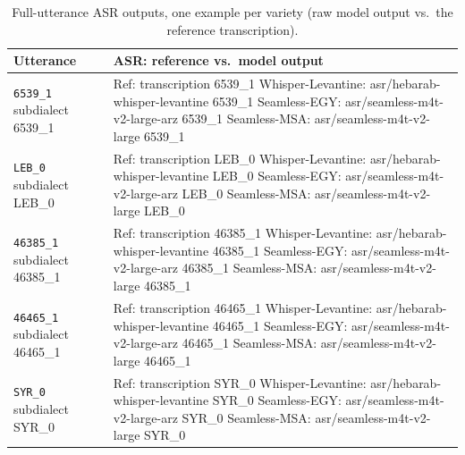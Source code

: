 \begin{table}[t]
\centering
\small
\begin{tabular}{p{} p{}}
\toprule
\textbf{Utterance} & \textbf{ASR: reference vs.\ model output} \\
\midrule
\texttt{6539\_1} \newline \scriptsize {{subdialect 6539_1}} & Ref: {{transcription 6539_1}} \newline Whisper-Levantine: {{asr/hebarab-whisper-levantine 6539_1}} \newline Seamless-EGY: {{asr/seamless-m4t-v2-large-arz 6539_1}} \newline Seamless-MSA: {{asr/seamless-m4t-v2-large 6539_1}} \\
\addlinespace[4pt]
\texttt{LEB\_0} \newline \scriptsize {{subdialect LEB_0}} & Ref: {{transcription LEB_0}} \newline Whisper-Levantine: {{asr/hebarab-whisper-levantine LEB_0}} \newline Seamless-EGY: {{asr/seamless-m4t-v2-large-arz LEB_0}} \newline Seamless-MSA: {{asr/seamless-m4t-v2-large LEB_0}} \\
\addlinespace[4pt]
\texttt{46385\_1} \newline \scriptsize {{subdialect 46385_1}} & Ref: {{transcription 46385_1}} \newline Whisper-Levantine: {{asr/hebarab-whisper-levantine 46385_1}} \newline Seamless-EGY: {{asr/seamless-m4t-v2-large-arz 46385_1}} \newline Seamless-MSA: {{asr/seamless-m4t-v2-large 46385_1}} \\
\addlinespace[4pt]
\texttt{46465\_1} \newline \scriptsize {{subdialect 46465_1}} & Ref: {{transcription 46465_1}} \newline Whisper-Levantine: {{asr/hebarab-whisper-levantine 46465_1}} \newline Seamless-EGY: {{asr/seamless-m4t-v2-large-arz 46465_1}} \newline Seamless-MSA: {{asr/seamless-m4t-v2-large 46465_1}} \\
\addlinespace[4pt]
\texttt{SYR\_0} \newline \scriptsize {{subdialect SYR_0}} & Ref: {{transcription SYR_0}} \newline Whisper-Levantine: {{asr/hebarab-whisper-levantine SYR_0}} \newline Seamless-EGY: {{asr/seamless-m4t-v2-large-arz SYR_0}} \newline Seamless-MSA: {{asr/seamless-m4t-v2-large SYR_0}} \\
\bottomrule
\end{tabular}
\caption{Full-utterance ASR outputs, one example per variety (raw model output vs.\ the reference transcription).}
\label{tab:asr-examples-full}
\end{table}
